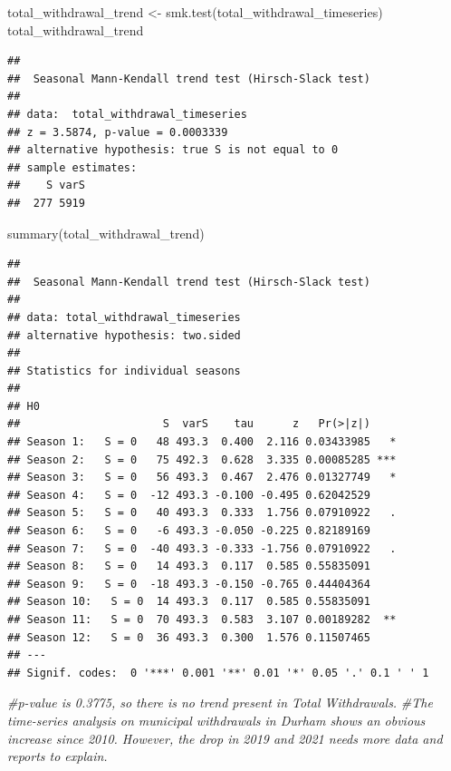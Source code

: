 \documentclass[
  12pt,
]{article}
\newenvironment{Shaded}{\begin{snugshade}}{\end{snugshade}}
\newcommand{\CommentTok}[1]{\textcolor[rgb]{0.56,0.35,0.01}{\textit{#1}}}
\newcommand{\FunctionTok}[1]{\textcolor[rgb]{0.00,0.00,0.00}{#1}}
\newcommand{\NormalTok}[1]{#1}
\newcommand{\OtherTok}[1]{\textcolor[rgb]{0.56,0.35,0.01}{#1}}
\begin{document}
\begin{Shaded}
\begin{Highlighting}[]
\NormalTok{total\_withdrawal\_trend }\OtherTok{\textless{}{-}} \FunctionTok{smk.test}\NormalTok{(total\_withdrawal\_timeseries)}
\NormalTok{total\_withdrawal\_trend}
\end{Highlighting}
\end{Shaded}

\begin{verbatim}
## 
##  Seasonal Mann-Kendall trend test (Hirsch-Slack test)
## 
## data:  total_withdrawal_timeseries
## z = 3.5874, p-value = 0.0003339
## alternative hypothesis: true S is not equal to 0
## sample estimates:
##    S varS 
##  277 5919
\end{verbatim}

\begin{Shaded}
\begin{Highlighting}[]
\FunctionTok{summary}\NormalTok{(total\_withdrawal\_trend)}
\end{Highlighting}
\end{Shaded}

\begin{verbatim}
## 
##  Seasonal Mann-Kendall trend test (Hirsch-Slack test)
## 
## data: total_withdrawal_timeseries
## alternative hypothesis: two.sided
## 
## Statistics for individual seasons
## 
## H0
##                      S  varS    tau      z   Pr(>|z|)    
## Season 1:   S = 0   48 493.3  0.400  2.116 0.03433985   *
## Season 2:   S = 0   75 492.3  0.628  3.335 0.00085285 ***
## Season 3:   S = 0   56 493.3  0.467  2.476 0.01327749   *
## Season 4:   S = 0  -12 493.3 -0.100 -0.495 0.62042529    
## Season 5:   S = 0   40 493.3  0.333  1.756 0.07910922   .
## Season 6:   S = 0   -6 493.3 -0.050 -0.225 0.82189169    
## Season 7:   S = 0  -40 493.3 -0.333 -1.756 0.07910922   .
## Season 8:   S = 0   14 493.3  0.117  0.585 0.55835091    
## Season 9:   S = 0  -18 493.3 -0.150 -0.765 0.44404364    
## Season 10:   S = 0  14 493.3  0.117  0.585 0.55835091    
## Season 11:   S = 0  70 493.3  0.583  3.107 0.00189282  **
## Season 12:   S = 0  36 493.3  0.300  1.576 0.11507465    
## ---
## Signif. codes:  0 '***' 0.001 '**' 0.01 '*' 0.05 '.' 0.1 ' ' 1
\end{verbatim}

\begin{Shaded}
\begin{Highlighting}[]
\CommentTok{\#p{-}value is 0.3775, so there is no trend present in Total Withdrawals.}
\CommentTok{\#The time{-}series analysis on municipal withdrawals in Durham shows an obvious increase since 2010. However, the drop in 2019 and 2021 needs more data and reports to explain. }
\end{Highlighting}
\end{Shaded}
\end{document}
